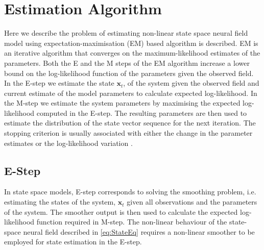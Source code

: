\documentclass[]{article}
\begin{document}
\section{Estimation Algorithm}\label{sec:EstimationAlgorithm}
Here we describe the problem of estimating non-linear state space neural field model using expectation-maximisation (EM) based algorithm \cite{Dempster1977,Shumway2000} is described. EM is an iterative algorithm that converges on the maximum-likelihood estimates of the parameters. Both the E and the M steps of the EM algorithm increase a lower bound on the log-likelihood function of the parameters given the observed field.  In the E-step we estimate the state $\mathbf x_t$, of the system given the observed field and current estimate of the model parameters to calculate expected log-likelihood. In the M-step we estimate the system parameters by maximising the expected log-likelihood computed in the E-step. The resulting parameters are then used to estimate the distribution of the state vector sequence for the next iteration. The stopping criterion is usually associated with either the change in the parameter estimates or the log-likelihood variation \cite{McLachlan1997}.
\subsection{E-Step}
In state space models, E-step corresponds to solving the smoothing problem, i.e. estimating the states of the system, $\mathbf x_t$ given all observations and the parameters of the system. The smoother output is then used to calculate the expected log-likelihood function required in M-step. The non-linear behaviour of the state-space neural field described in \eqref{eq:StateEq} requires a non-linear smoother to be employed for state estimation in the E-step.
\end{document}
